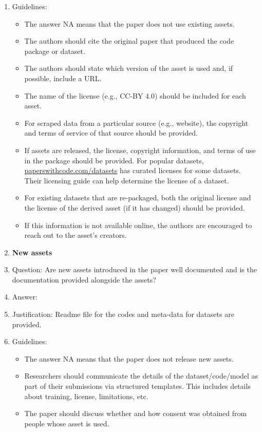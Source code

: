\documentclass{article}
\begin{document}
\begin{enumerate}
    \item[] Guidelines:
    \begin{itemize}
        \item The answer NA means that the paper does not use existing assets.
        \item The authors should cite the original paper that produced the code package or dataset.
        \item The authors should state which version of the asset is used and, if possible, include a URL.
        \item The name of the license (e.g., CC-BY 4.0) should be included for each asset.
        \item For scraped data from a particular source (e.g., website), the copyright and terms of service of that source should be provided.
        \item If assets are released, the license, copyright information, and terms of use in the package should be provided. For popular datasets, \url{paperswithcode.com/datasets} has curated licenses for some datasets. Their licensing guide can help determine the license of a dataset.
        \item For existing datasets that are re-packaged, both the original license and the license of the derived asset (if it has changed) should be provided.
        \item If this information is not available online, the authors are encouraged to reach out to the asset's creators.
    \end{itemize}
\item {\bf New assets}
    \item[] Question: Are new assets introduced in the paper well documented and is the documentation provided alongside the assets?
    \item[] Answer: \answerYes{}
    \item[] Justification: Readme file for the codes and meta-data for datasets are provided.
    \item[] Guidelines:
    \begin{itemize}
        \item The answer NA means that the paper does not release new assets.
        \item Researchers should communicate the details of the dataset/code/model as part of their submissions via structured templates. This includes details about training, license, limitations, etc.
        \item The paper should discuss whether and how consent was obtained from people whose asset is used.

\end{itemize}
\end{enumerate}
\end{document}
